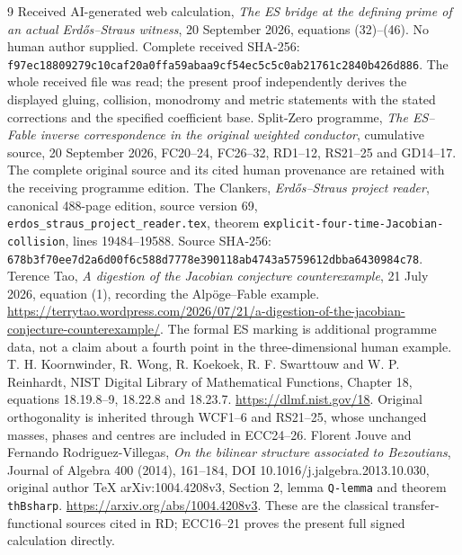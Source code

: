 \documentclass[11pt]{article}
\begin{document}
\begin{thebibliography}{9}
 Received AI-generated web calculation,
\emph{The ES bridge at the defining prime of an actual Erd\H{o}s--Straus witness},
20 September 2026, equations (32)--(46). No human author supplied.
Complete received SHA-256:
\texttt{f97ec18809279c10caf20a0ffa59abaa9cf54ec5c5c0ab21761c2840b426d886}.
The whole received file was read; the present proof independently derives
the displayed gluing, collision, monodromy and metric statements with
the stated corrections and the specified coefficient base.
 Split-Zero programme, \emph{The ES--Fable inverse
correspondence in the original weighted conductor}, cumulative source,
20 September 2026, FC20--24, FC26--32, RD1--12, RS21--25 and GD14--17.
The complete original source and its cited human provenance are retained
with the receiving programme edition.
 The Clankers, \emph{Erd\H{o}s--Straus project reader},
canonical 488-page edition, source version 69,
\texttt{erdos\_straus\_project\_reader.tex}, theorem
\texttt{explicit-four-time-Jacobian-collision}, lines 19484--19588.
Source SHA-256:
\texttt{678b3f70ee7d2a6d00f6c588d7778e390118ab4743a5759612dbba6430984c78}.
 Terence Tao, \emph{A digestion of the Jacobian conjecture
counterexample}, 21 July 2026, equation (1), recording the Alp\"oge--Fable
example. \url{https://terrytao.wordpress.com/2026/07/21/a-digestion-of-the-jacobian-conjecture-counterexample/}.
The formal ES marking is additional programme data, not a claim about
a fourth point in the three-dimensional human example.
 T. H. Koornwinder, R. Wong, R. Koekoek, R. F. Swarttouw
and W. P. Reinhardt, NIST Digital Library of Mathematical Functions,
Chapter 18, equations 18.19.8--9, 18.22.8 and 18.23.7.
\url{https://dlmf.nist.gov/18}.
Original orthogonality is inherited through WCF1--6 and RS21--25, whose
unchanged masses, phases and centres are included in ECC24--26.
 Florent Jouve and Fernando Rodriguez-Villegas,
\emph{On the bilinear structure associated to Bezoutians}, Journal of
Algebra 400 (2014), 161--184, DOI 10.1016/j.jalgebra.2013.10.030,
original author TeX arXiv:1004.4208v3, Section 2, lemma \texttt{Q-lemma}
and theorem \texttt{thBsharp}. \url{https://arxiv.org/abs/1004.4208v3}.
These are the classical transfer-functional sources cited in RD;
ECC16--21 proves the present full signed calculation directly.
\end{thebibliography}
\end{document}
